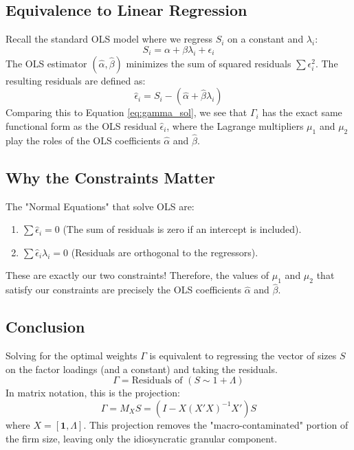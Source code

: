 \documentclass[11pt]{article}
\begin{document}
\subsection{Equivalence to Linear Regression}
Recall the standard OLS model where we regress $S_i$ on a constant and $\lambda_i$:
\begin{equation}
S_i = \alpha + \beta \lambda_i + \epsilon_i
\end{equation}
The OLS estimator $(\hat{\alpha}, \hat{\beta})$ minimizes the sum of squared residuals $\sum \epsilon_i^2$. The resulting residuals are defined as:
\begin{equation}
\hat{\epsilon}_i = S_i - (\hat{\alpha} + \hat{\beta} \lambda_i)
\end{equation}
Comparing this to Equation \ref{eq:gamma_sol}, we see that $\Gamma_i$ has the exact same functional form as the OLS residual $\hat{\epsilon}_i$, where the Lagrange multipliers $\mu_1$ and $\mu_2$ play the roles of the OLS coefficients $\hat{\alpha}$ and $\hat{\beta}$.

\subsection{Why the Constraints Matter}
The "Normal Equations" that solve OLS are:
\begin{enumerate}
    \item $\sum \hat{\epsilon}_i = 0$ (The sum of residuals is zero if an intercept is included).
    \item $\sum \hat{\epsilon}_i \lambda_i = 0$ (Residuals are orthogonal to the regressors).
\end{enumerate}
These are exactly our two constraints! Therefore, the values of $\mu_1$ and $\mu_2$ that satisfy our constraints are precisely the OLS coefficients $\hat{\alpha}$ and $\hat{\beta}$.

\subsection{Conclusion}
Solving for the optimal weights $\Gamma$ is equivalent to regressing the vector of sizes $S$ on the factor loadings (and a constant) and taking the residuals. 
\begin{equation}
\Gamma = \text{Residuals of } (S \sim 1 + \Lambda)
\end{equation}
In matrix notation, this is the projection:
\begin{equation}
\Gamma = M_X S = (I - X(X'X)^{-1}X')S
\end{equation}
where $X = [\mathbf{1}, \Lambda]$. This projection removes the "macro-contaminated" portion of the firm size, leaving only the idiosyncratic granular component.
\end{document}
